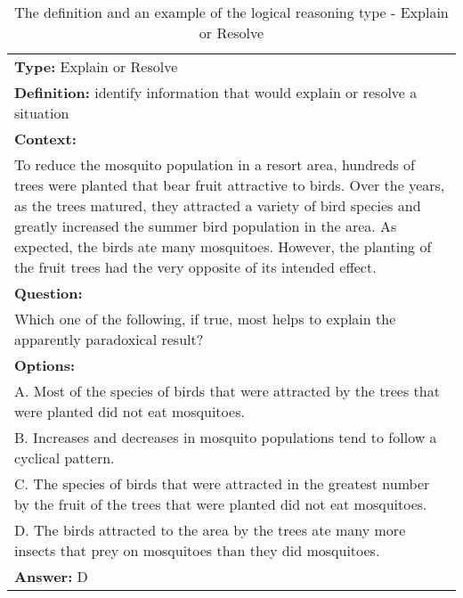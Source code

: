 \documentclass{article} \usepackage{iclr2020_conference,times}
\begin{document}
\begin{table}
	\small
	\centering
	\caption{The definition and an example of the logical reasoning type - Explain or Resolve}
	\begin{tabular}{|p{}|}
		\hline
		{\bf Type: }Explain or Resolve \\
		
		{\bf Definition: } identify information that would explain or resolve a situation
		\\
        \hline		
		{\bf Context:} \\
		To reduce the mosquito population in a resort area, hundreds of trees were planted that bear fruit attractive to birds. Over the years, as the trees matured, they attracted a variety of bird species and greatly increased the summer bird population in the area. As expected, the birds ate many mosquitoes. However, the planting of the fruit trees had the very opposite of its intended effect.\\
		{\bf Question:}\\Which one of the following, if true, most helps to explain the apparently paradoxical result?\\
		{\bf Options:}\\
			A. Most of the species of birds that were attracted by the trees that were planted did not eat mosquitoes.\\
			B. Increases and decreases in mosquito populations tend to follow a cyclical pattern.\\
			C. The species of birds that were attracted in the greatest number by the fruit of the trees that were planted did not eat mosquitoes.\\
			D. The birds attracted to the area by the trees ate many more insects that prey on mosquitoes than they did mosquitoes.\\
		{\bf Answer:} D \\
		\hline
	\end{tabular}
	\label{tab:explain-resolve}
\end{table}
\end{document}
